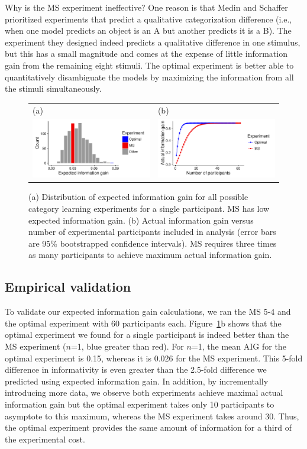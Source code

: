 \documentclass{article}
\begin{document}
Why is the MS experiment ineffective?
One reason is that Medin and Schaffer prioritized experiments that predict a qualitative categorization difference (i.e., when one model predicts an object is an A  but another predicts it is a B).
The experiment they designed indeed predicts a qualitative difference in one stimulus, but this has a small magnitude and comes at the expense of little information gain from the remaining eight stimuli.
The optimal experiment is better able to quantitatively disambiguate the models by maximizing the information from all the stimuli simultaneously.

\begin{figure}[t]
\centering
\begin{tabular}{l l}
(a) & (b)\\
\includegraphics[width=2.5in]{img/category-eig-dist.pdf} & \includegraphics[width=2.5in]{img/category-aig-curve.pdf}\\
\end{tabular}
\caption{(a) Distribution of expected information gain for all possible category learning experiments for a single participant. MS has low expected information gain. (b) Actual information gain versus number of experimental participants included in analysis (error bars are 95\% bootstrapped confidence intervals). MS requires three times as many participants to achieve maximum actual information gain.}
\label{fig:dist}
\end{figure}

\subsection{Empirical validation}

To validate our expected information gain calculations, we ran the MS 5-4 and the optimal experiment with 60 participants each.
Figure~\ref{fig:dist}b shows that the optimal experiment we found for a single participant is indeed better than the MS experiment ($n$=1, blue greater than red).
For $n$=1, the mean AIG for the optimal experiment is 0.15, whereas it is 0.026 for the MS experiment.
This 5-fold difference in informativity is even greater than the 2.5-fold difference we predicted using expected information gain.
In addition, by incrementally introducing more data, we observe both experiments achieve maximal actual information gain but the optimal experiment takes only 10 participants to asymptote to this maximum, whereas the MS experiment takes around 30.
Thus, the optimal experiment provides the same amount of information for a third of the experimental cost.
\end{document}
